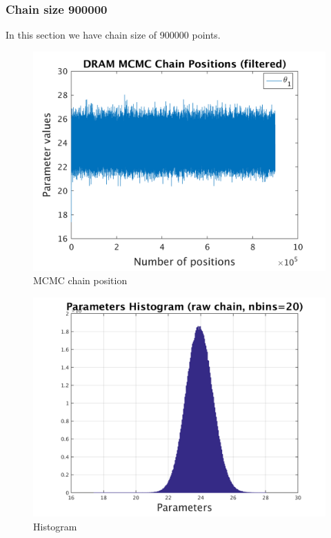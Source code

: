 \subsubsection{Chain size 900000 }

In this section we have chain size of 900000 points. 

\begin{figure}[H]
  
  \centering
   \includegraphics[scale=0.75]{100_results/outputData_900000/simple_ip_chain_pos_filt}
   \caption{MCMC chain position }
\end{figure}


\begin{figure}[H]
  
  \centering
   \includegraphics[scale=0.75]{100_results/outputData_900000/simple_ip_hist_raw}
   \caption{Histogram}
\end{figure}



